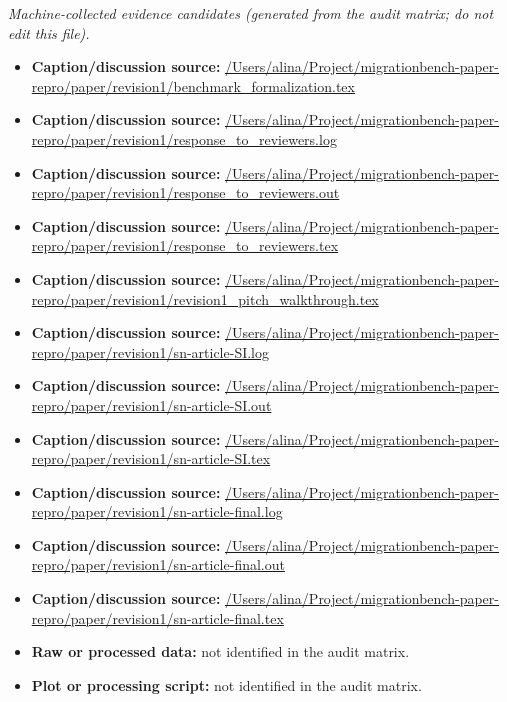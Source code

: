 \emph{Machine-collected evidence candidates (generated from the audit matrix; do not edit this file).}
\begin{itemize}[leftmargin=1.4em,noitemsep]
\item \textbf{Caption/discussion source:} \url{/Users/alina/Project/migrationbench-paper-repro/paper/revision1/benchmark_formalization.tex}
\item \textbf{Caption/discussion source:} \url{/Users/alina/Project/migrationbench-paper-repro/paper/revision1/response_to_reviewers.log}
\item \textbf{Caption/discussion source:} \url{/Users/alina/Project/migrationbench-paper-repro/paper/revision1/response_to_reviewers.out}
\item \textbf{Caption/discussion source:} \url{/Users/alina/Project/migrationbench-paper-repro/paper/revision1/response_to_reviewers.tex}
\item \textbf{Caption/discussion source:} \url{/Users/alina/Project/migrationbench-paper-repro/paper/revision1/revision1_pitch_walkthrough.tex}
\item \textbf{Caption/discussion source:} \url{/Users/alina/Project/migrationbench-paper-repro/paper/revision1/sn-article-SI.log}
\item \textbf{Caption/discussion source:} \url{/Users/alina/Project/migrationbench-paper-repro/paper/revision1/sn-article-SI.out}
\item \textbf{Caption/discussion source:} \url{/Users/alina/Project/migrationbench-paper-repro/paper/revision1/sn-article-SI.tex}
\item \textbf{Caption/discussion source:} \url{/Users/alina/Project/migrationbench-paper-repro/paper/revision1/sn-article-final.log}
\item \textbf{Caption/discussion source:} \url{/Users/alina/Project/migrationbench-paper-repro/paper/revision1/sn-article-final.out}
\item \textbf{Caption/discussion source:} \url{/Users/alina/Project/migrationbench-paper-repro/paper/revision1/sn-article-final.tex}
\item \textbf{Raw or processed data:} not identified in the audit matrix.
\item \textbf{Plot or processing script:} not identified in the audit matrix.
\end{itemize}
